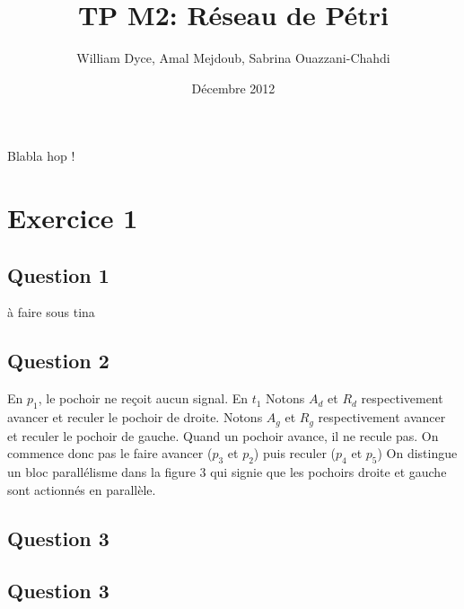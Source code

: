 \documentclass[a4paper, 12pt]{article}
\title{TP M2: Réseau de Pétri} \author{William Dyce, Amal Mejdoub, Sabrina Ouazzani-Chahdi}
\date{Décembre 2012}
\begin{document}
\newcommand\bcdef{\texttt{[image: def.png]}}

\maketitle

\begin{bclogo}[couleur=red!30, arrondi=0.1, logo= \bcdef,
    ombre=true, epOmbre=0.25, couleurOmbre=black!30, epBarre=1,
    barre=zigzag]{Blabla} hop !
\end{bclogo}

\section{Exercice 1}
\subsection{Question 1}
à faire sous tina
\subsection{Question 2}
En $p_1$, le pochoir ne reçoit aucun signal.
En $t_1$
Notons $A_d$ et $R_d$ respectivement avancer et reculer le pochoir de
droite.
Notons $A_g$ et $R_g$ respectivement avancer et reculer le pochoir de gauche.
Quand un pochoir avance, il ne recule pas.
On commence donc pas le faire avancer ($p_3$ et $p_2$) puis reculer ($p_4$ et $p_5$)
On distingue un bloc parallélisme dans la figure 3 qui signie que les
pochoirs droite et gauche sont actionnés en parallèle.

\subsection{Question 3}

\subsection{Question 3}
\end{document}
